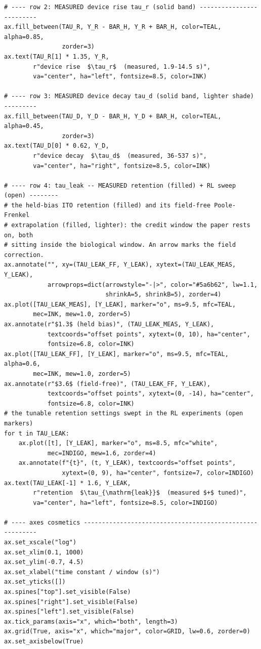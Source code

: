 \begin{lstlisting}[caption={schematics.ipynb code cell 10},label={lst:mrl-nb-schematics-10}]
# ---- row 2: MEASURED device rise tau_r (solid band) -------------------------
ax.fill_between(TAU_R, Y_R - BAR_H, Y_R + BAR_H, color=TEAL, alpha=0.85,
                zorder=3)
ax.text(TAU_R[1] * 1.35, Y_R,
        r"device rise  $\tau_r$  (measured, 1.9-14.5 s)",
        va="center", ha="left", fontsize=8.5, color=INK)

# ---- row 3: MEASURED device decay tau_d (solid band, lighter shade) ---------
ax.fill_between(TAU_D, Y_D - BAR_H, Y_D + BAR_H, color=TEAL, alpha=0.45,
                zorder=3)
ax.text(TAU_D[0] * 0.62, Y_D,
        r"device decay  $\tau_d$  (measured, 36-537 s)",
        va="center", ha="right", fontsize=8.5, color=INK)

# ---- row 4: tau_leak -- MEASURED retention (filled) + RL sweep (open) --------
# the held-bias ITO retention (filled) and its field-free Poole-Frenkel
# extrapolation (filled, lighter): the credit window the paper rests on, both
# sitting inside the biological window. An arrow marks the field correction.
ax.annotate("", xy=(TAU_LEAK_FF, Y_LEAK), xytext=(TAU_LEAK_MEAS, Y_LEAK),
            arrowprops=dict(arrowstyle="-|>", color="#5a6b62", lw=1.1,
                            shrinkA=5, shrinkB=5), zorder=4)
ax.plot([TAU_LEAK_MEAS], [Y_LEAK], marker="o", ms=9.5, mfc=TEAL,
        mec=INK, mew=1.0, zorder=5)
ax.annotate(r"$1.3$ (held bias)", (TAU_LEAK_MEAS, Y_LEAK),
            textcoords="offset points", xytext=(0, 10), ha="center",
            fontsize=6.8, color=INK)
ax.plot([TAU_LEAK_FF], [Y_LEAK], marker="o", ms=9.5, mfc=TEAL, alpha=0.6,
        mec=INK, mew=1.0, zorder=5)
ax.annotate(r"$3.6$ (field-free)", (TAU_LEAK_FF, Y_LEAK),
            textcoords="offset points", xytext=(0, -14), ha="center",
            fontsize=6.8, color=INK)
# the tunable retention settings swept in the RL experiments (open markers)
for t in TAU_LEAK:
    ax.plot([t], [Y_LEAK], marker="o", ms=8.5, mfc="white",
            mec=INDIGO, mew=1.6, zorder=4)
    ax.annotate(f"{t}", (t, Y_LEAK), textcoords="offset points",
                xytext=(0, 9), ha="center", fontsize=7, color=INDIGO)
ax.text(TAU_LEAK[-1] * 1.6, Y_LEAK,
        r"retention  $\tau_{\mathrm{leak}}$  (measured $+$ tuned)",
        va="center", ha="left", fontsize=8.5, color=INDIGO)

# ---- axes cosmetics ---------------------------------------------------------
ax.set_xscale("log")
ax.set_xlim(0.1, 1000)
ax.set_ylim(-0.7, 4.5)
ax.set_xlabel("time constant / window (s)")
ax.set_yticks([])
ax.spines["top"].set_visible(False)
ax.spines["right"].set_visible(False)
ax.spines["left"].set_visible(False)
ax.tick_params(axis="x", which="both", length=3)
ax.grid(True, axis="x", which="major", color=GRID, lw=0.6, zorder=0)
ax.set_axisbelow(True)


\end{lstlisting}
